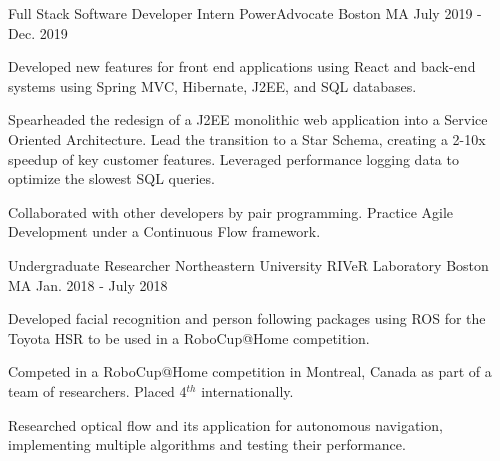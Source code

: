 
\begin{cventries}
\cventry
    {Full Stack Software Developer Intern} %
    {PowerAdvocate} %
    {Boston MA} %
    {July 2019 - Dec. 2019} %
    {
      \begin{cvitems} %
        \item {Developed new features for front end applications using React and back-end systems using Spring MVC, Hibernate, J2EE, and SQL databases.}
        \item {Spearheaded the redesign of a J2EE monolithic web application into a Service Oriented Architecture. Lead the transition to a Star Schema, creating a 2-10x speedup of key customer features. Leveraged performance logging data to optimize the slowest SQL queries.}
        \item {Collaborated with other developers by pair programming. Practice Agile Development under a Continuous Flow framework.}
      \end{cvitems}
    }
  \cventry
    {Undergraduate Researcher} %
    {Northeastern University RIVeR Laboratory} %
    {Boston MA} %
    {Jan. 2018 - July 2018} %
    {
      \begin{cvitems} %
        \item {Developed facial recognition and person following packages using ROS for the Toyota HSR to be used in a RoboCup@Home competition.}
        \item {Competed in a RoboCup@Home competition in Montreal, Canada as part of a team of researchers. Placed 4$^{th}$ internationally.}
        \item {Researched optical flow and its application for autonomous navigation, implementing multiple algorithms and testing their performance.}
      \end{cvitems}
    }


\end{cventries}
